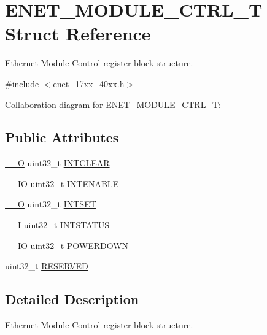 \hypertarget{structENET__MODULE__CTRL__T}{}\section{E\+N\+E\+T\+\_\+\+M\+O\+D\+U\+L\+E\+\_\+\+C\+T\+R\+L\+\_\+T Struct Reference}
\label{structENET__MODULE__CTRL__T}


Ethernet Module Control register block structure.  




{\ttfamily \#include $<$enet\+\_\+17xx\+\_\+40xx.\+h$>$}



Collaboration diagram for E\+N\+E\+T\+\_\+\+M\+O\+D\+U\+L\+E\+\_\+\+C\+T\+R\+L\+\_\+T\+:
\subsection*{Public Attributes}
\begin{DoxyCompactItemize}
\item 
\hyperlink{core__cm3_8h_a7e25d9380f9ef903923964322e71f2f6}{\+\_\+\+\_\+O} uint32\+\_\+t \hyperlink{structENET__MODULE__CTRL__T_a67c87b65d221dfc156c41c76d80aebdb}{I\+N\+T\+C\+L\+E\+AR}
\item 
\hyperlink{core__cm3_8h_aec43007d9998a0a0e01faede4133d6be}{\+\_\+\+\_\+\+IO} uint32\+\_\+t \hyperlink{structENET__MODULE__CTRL__T_a4d21be82461cf028b89fe0e314718352}{I\+N\+T\+E\+N\+A\+B\+LE}
\item 
\hyperlink{core__cm3_8h_a7e25d9380f9ef903923964322e71f2f6}{\+\_\+\+\_\+O} uint32\+\_\+t \hyperlink{structENET__MODULE__CTRL__T_a7898d6a89c630ecd471a7a059ee376d6}{I\+N\+T\+S\+ET}
\item 
\hyperlink{core__cm3_8h_af63697ed9952cc71e1225efe205f6cd3}{\+\_\+\+\_\+I} uint32\+\_\+t \hyperlink{structENET__MODULE__CTRL__T_a7dac73c2fd05c5247f006717dbe6c9fa}{I\+N\+T\+S\+T\+A\+T\+US}
\item 
\hyperlink{core__cm3_8h_aec43007d9998a0a0e01faede4133d6be}{\+\_\+\+\_\+\+IO} uint32\+\_\+t \hyperlink{structENET__MODULE__CTRL__T_a42b5ebd11c8549b2ba2bb072b5b42736}{P\+O\+W\+E\+R\+D\+O\+WN}
\item 
uint32\+\_\+t \hyperlink{structENET__MODULE__CTRL__T_a511b82f8a23341a28b95e615d75580ef}{R\+E\+S\+E\+R\+V\+ED}
\end{DoxyCompactItemize}


\subsection{Detailed Description}
Ethernet Module Control register block structure. 

